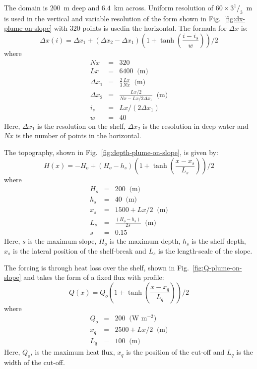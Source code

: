 The domain is $200$~m deep and $6.4$~km across. Uniform resolution of
$60\times3^1/_3$~m is used in the vertical and variable resolution of
the form shown in Fig.~\ref{fig:dx-plume-on-slope} with $320$ points
is usedin the horizontal. The formula for $\Delta x$ is:
\begin{displaymath}
\Delta x(i) = \Delta x_1 + ( \Delta x_2 - \Delta x_1 )
( 1 + \tanh{\left(\frac{i-i_s}{w}\right)} ) /2
\end{displaymath}
where
\begin{eqnarray*}
Nx & = & 320 \\
Lx & = & 6400 \;\; \mbox{(m)} \\
\Delta x_1 & = & \frac{2}{3} \frac{Lx}{Nx} \;\; \mbox{(m)} \\
\Delta x_2 & = & \frac{Lx/2}{Nx-Lx/2 \Delta x_1} \;\; \mbox{(m)} \\
i_s & = & Lx/( 2 \Delta x_1 ) \\
w & = & 40 
\end{eqnarray*}
Here, $\Delta x_1$ is the resolution on the shelf, $\Delta x_2$ is the
resolution in deep water and $Nx$ is the number of points in the
horizontal.

The topography, shown in Fig.~\ref{fig:depth-plume-on-slope}, is given
by:
\begin{displaymath}
H(x) = -H_o + (H_o - h_s) ( 1 + \tanh{\left(\frac{x-x_s}{L_s}\right)} ) / 2
\end{displaymath}
where
\begin{eqnarray*}
H_o & = & 200 \;\; \mbox{(m)} \\
h_s & = & 40 \;\; \mbox{(m)} \\
x_s & = & 1500 + Lx/2 \;\; \mbox{(m)} \\
L_s & = & \frac{(H_o - h_s)}{2 s} \;\; \mbox{(m)} \\
s & = & 0.15
\end{eqnarray*}
Here, $s$ is the maximum slope, $H_o$ is the maximum depth, $h_s$ is
the shelf depth, $x_s$ is the lateral position of the shelf-break and
$L_s$ is the length-scale of the slope.

The forcing is through heat loss over the shelf, shown in
Fig.~\ref{fig:Q-plume-on-slope} and takes the form of a fixed flux
with profile:
\begin{displaymath}
Q(x) = Q_o ( 1 + \tanh{\left(\frac{x - x_q}{L_q}\right)} ) / 2
\end{displaymath}
where
\begin{eqnarray*}
Q_o & = & 200 \;\; \mbox{(W m$^{-2}$)} \\
x_q & = & 2500 + Lx/2 \;\; \mbox{(m)} \\
L_q & = & 100 \;\; \mbox{(m)}
\end{eqnarray*}
Here, $Q_o$, is the maximum heat flux, $x_q$ is the position of the
cut-off and $L_q$ is the width of the cut-off.


